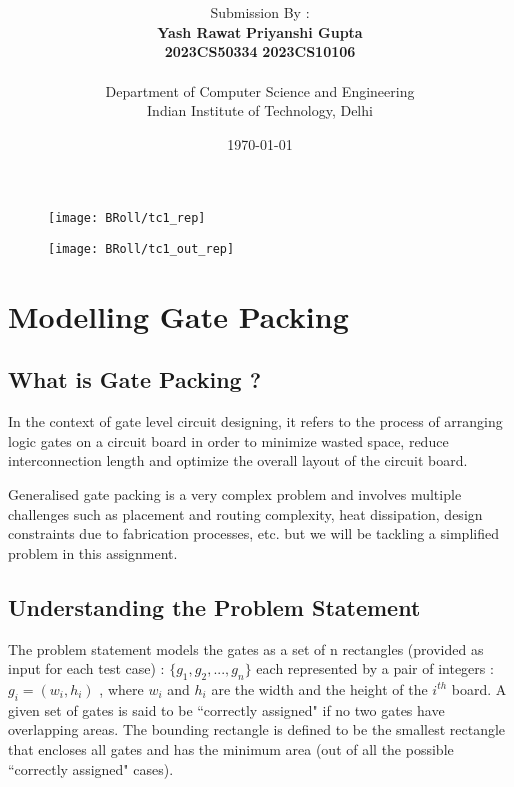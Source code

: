 \documentclass[12pt, a4paper,openany]{article}
\title{\vspace{-3cm} \makebox[\textwidth][c]{COL215 SW Assignment 1 - Gate Packing}}
\author{Submission By :\\ \hspace{0.5cm} \textbf{Yash Rawat} \hspace{1cm} \textbf{Priyanshi Gupta}\\ \textbf{2023CS50334} \hspace{1.3cm} \textbf{2023CS10106} \\ \\ Department of Computer Science and Engineering \\ Indian Institute of Technology, Delhi}
\date{\today}
\begin{document}
 
\maketitle

\begin{figure}[ht]
\centering
  \texttt{[image: BRoll/tc1\_rep]}
  \label{fig:basys_b}
\end{figure}
\begin{figure}[ht]
  \centering
  \texttt{[image: BRoll/tc1\_out\_rep]}
  \label{fig:broll_mux}
\end{figure}

\newpage %

\section{Modelling Gate Packing}
\subsection{What is Gate Packing ?}
\begin{flushleft}
In the context of gate level circuit designing, it refers to the process of arranging logic gates on a circuit board in order to minimize wasted space, reduce interconnection length and optimize the overall layout of the circuit board.
\end{flushleft}
\begin{flushleft}
Generalised gate packing is a very complex problem and involves multiple challenges such as placement and routing complexity, heat dissipation, design constraints due to fabrication processes, etc. but we will be tackling a simplified problem in this assignment.
\end{flushleft}
\subsection{Understanding the Problem Statement}
\begin{flushleft}
The problem statement models the gates as a set of n rectangles (provided as input for each test case) : \( \{g_{1},g_{2},...,g_{n}\}\) each represented by a pair of integers : \(g_{i} = (w_{i},h_{i})\) , where \(w_{i}\) and \(h_{i}\) are the width and the height of the \(i^{th}\) board. A given set of gates is said to be “correctly assigned" if no two gates have overlapping areas. The bounding rectangle is defined to be the smallest rectangle that encloses all gates and has the minimum area (out of all the possible “correctly assigned" cases).
\end{flushleft}
\end{document}

